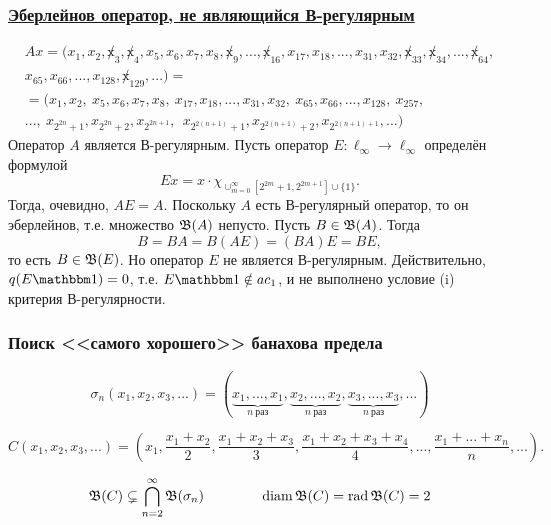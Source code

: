 \begin{frame}\frametitle{\underline{Эберлейнов оператор, не являющийся В-регулярным}}
	\begin{multline}
		\label{eq:oper_A_throws_out_2power_blocks}
		Ax = (x_1, x_2, \not x_3, \not x_4, x_5, x_6, x_7, x_8, \not x_9, ..., \not x_{16}, x_{17}, x_{18}, ..., x_{31}, x_{32}, \not x_{33}, \not x_{34}, ..., \not x_{64},
		\\
		x_{65}, x_{66}, ..., x_{128}, \not x_{129}, ...)=
		\\=
		(x_1, x_2, \ x_5, x_6, x_7, x_8, \ x_{17}, x_{18}, ..., x_{31}, x_{32}, \ x_{65}, x_{66}, ..., x_{128}, \ x_{257},
		\\
		..., \ x_{2^{2n} +1}, x_{2^{2n} +2},  x_{2^{2n+1}}, \ \ x_{2^{2(n+1)} +1},  x_{2^{2(n+1)} +2},  x_{2^{2(n+1)+1}}, ...)
	\end{multline}
	Оператор $A$ является В-регулярным.
	Пусть оператор $E:\ell_\infty\to\ell_\infty$ определён формулой
	\begin{equation}
		Ex = x \cdot \chi_{\cup_{m=0}^{\infty}\left[2^{2 m}+1, 2^{2 m+1}\right] \cup\{1\}}
		.
	\end{equation}
	Тогда, очевидно, $AE=A$.
	Поскольку $A$ есть В-регулярный оператор, то он эберлейнов,
	т.е. множество $\mathfrak{B}(A)$ непусто.
	Пусть $B\in\mathfrak{B}(A)$. Тогда
	\begin{equation}
		B = BA = B(AE) = (BA)E = BE
		,
	\end{equation}
	то есть $B\in\mathfrak{B}(E)$.
	Но оператор $E$ не является В-регулярным.
	Действительно, $q(E\one) =0$, т.е. $ E\one \notin ac_1$,
	и не выполнено условие (i) критерия В-регулярности.
\end{frame}


\begin{frame}\frametitle{Поиск <<самого хорошего>> банахова предела}
	\begin{equation}
		\sigma_n (x_1, x_2, x_3, ...) = (
		\underbrace{x_1,...,x_1}_{n~\text{раз}},
		\underbrace{x_2,...,x_2}_{n~\text{раз}},
		\underbrace{x_3,...,x_3}_{n~\text{раз}},
		...)
	\end{equation}

	\begin{equation}
		C (x_1, x_2, x_3, ...) = \left(
		x_1,
		\dfrac{x_1+x_2}2,
		\dfrac{x_1+x_2 + x_3}3,
		\dfrac{x_1+x_2+x_3+x_4}4,
		...,
		\dfrac{x_1+...+x_n}n,
		...\right)
		.
	\end{equation}

	\begin{equation}
		\mathfrak{B}(C) \subsetneq \bigcap_{n=2}^\infty \mathfrak{B}(\sigma_n)
		\qquad
		\qquad
		\operatorname{diam}\mathfrak{B}(C) = \operatorname{rad} \mathfrak{B}(C) = 2
	\end{equation}
\end{frame}


